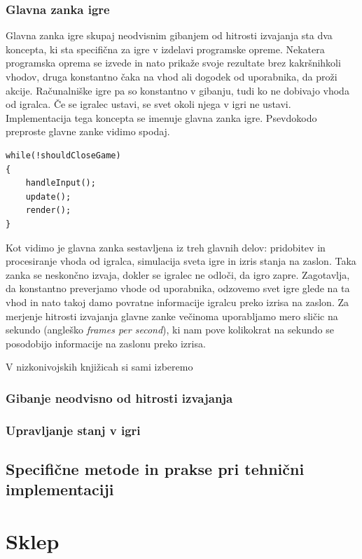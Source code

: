 \documentclass[12pt,a4paper,twoside]{book}
\begin{document}
\subsection{Glavna zanka igre}
Glavna zanka igre skupaj neodvisnim gibanjem od hitrosti izvajanja sta dva koncepta, ki sta specifična za igre v izdelavi programske opreme. Nekatera programska oprema se izvede in nato prikaže svoje rezultate brez kakršnihkoli vhodov, druga konstantno čaka na vhod ali dogodek od uporabnika, da proži akcije. Računalniške igre pa so konstantno v gibanju, tudi ko ne dobivajo vhoda od igralca. Če se igralec ustavi, se svet okoli njega v igri ne ustavi. Implementacija tega koncepta se imenuje glavna zanka igre. Psevdokodo preproste glavne zanke vidimo spodaj.
\begin{listing}[ht]
\begin{verbatim}
while(!shouldCloseGame)
{
	handleInput();
	update();
	render();
}
\end{verbatim}
\vspace*{-2em}
\end{listing}
Kot vidimo je glavna zanka sestavljena iz treh glavnih delov: pridobitev in procesiranje vhoda od igralca, simulacija sveta igre in izris stanja na zaslon. Taka zanka se neskončno izvaja, dokler se igralec ne odloči, da igro zapre. Zagotavlja, da konstantno preverjamo vhode od uporabnika, odzovemo svet igre glede na ta vhod in nato takoj damo povratne informacije igralcu preko izrisa na zaslon. Za merjenje hitrosti izvajanja glavne zanke večinoma uporabljamo mero sličic na sekundo (angleško \textit{frames per second}), ki nam pove kolikokrat na sekundo se posodobijo informacije na zaslonu preko izrisa.

V nizkonivojskih knjižicah si sami izberemo 	

\subsection{Gibanje neodvisno od hitrosti izvajanja}

\subsection{Upravljanje stanj v igri}

\section{Specifične metode in prakse pri tehnični implementaciji}

\chapter{Sklep}\thispagestyle{fancy}

\cleardoublepage


\end{document}
